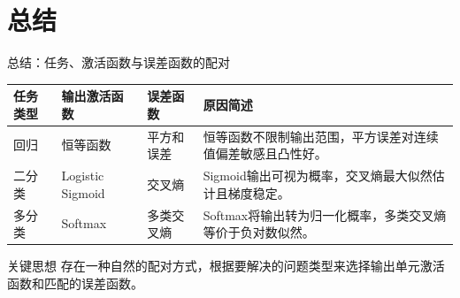 \documentclass[t,aspectratio=169]{beamer} %
\begin{document}
\section{总结}
\begin{frame}{总结：任务、激活函数与误差函数的配对}
    \centering
    \small
    \renewcommand{\arraystretch}{1.5}
    \begin{tabular}{|l|l|l|p{5.5cm}|}
        \hline
        \textbf{任务类型} & \textbf{输出激活函数} & \textbf{误差函数} & \textbf{原因简述} \\ \hline
        回归 & 恒等函数 & 平方和误差 & 恒等函数不限制输出范围，平方误差对连续值偏差敏感且凸性好。 \\ \hline
        二分类 & Logistic Sigmoid & 交叉熵 & Sigmoid输出可视为概率，交叉熵最大似然估计且梯度稳定。 \\ \hline
        多分类 & Softmax & 多类交叉熵 & Softmax将输出转为归一化概率，多类交叉熵等价于负对数似然。 \\ \hline
    \end{tabular}
    \renewcommand{\arraystretch}{1}
    \vspace{1em}
    
    \begin{block}{关键思想}
        存在一种自然的配对方式，根据要解决的问题类型来选择输出单元激活函数和匹配的误差函数。
    \end{block}
\end{frame}
\end{document}
